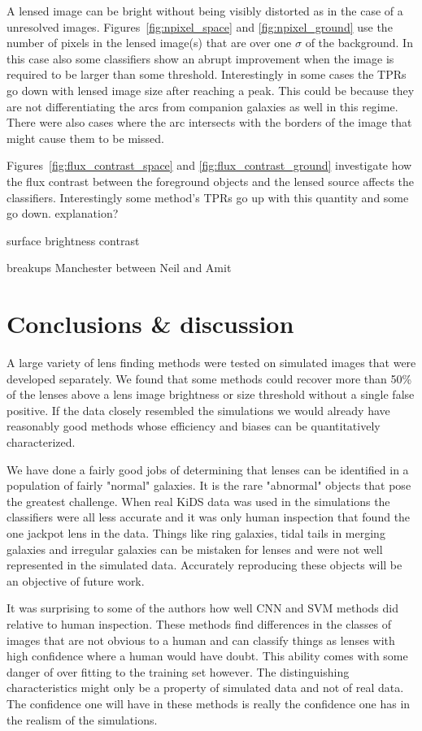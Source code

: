 \documentclass[useAMS,usenatbib]{mnras}
\newcommand{\red}[1]{{\color{red} #1}}
\begin{document}
A lensed image can be bright without being visibly distorted as in the case of a unresolved images.  Figures~\ref{fig:npixel_space} and \ref{fig:npixel_ground} use the number of pixels in the lensed image(s) that are over  one $\sigma$ of the background.  In this case also some classifiers show an abrupt improvement when the image is required to be larger than some threshold.  Interestingly in some cases the TPRs go down with lensed image size after reaching a peak.  This could be because they are not differentiating the arcs from companion galaxies as well in this regime.  There were also cases where the arc intersects with the borders of the image that might cause them to be missed.

Figures~\ref{fig:flux_contrast_space} and \ref{fig:flux_contrast_ground} investigate how the flux contrast between the foreground objects and the lensed source affects the classifiers.  Interestingly some method's TPRs go up with this quantity and some go down.  \red{explanation?}

\red{surface brightness contrast}

\red{breakups Manchester between Neil and Amit}

\section{Conclusions \& discussion}
\label{sec:conclusion}

A large variety of lens finding methods were tested on simulated images that were developed separately.    We found that some methods could recover more than 50\% of the lenses above a lens image brightness or size threshold without a single false positive.  If the data closely resembled the simulations we would already have reasonably good methods whose efficiency and biases can be quantitatively characterized.

We have done a fairly good jobs of determining that lenses can be identified in a population of fairly "normal" galaxies.  It is the rare "abnormal" objects that pose the greatest challenge.  When real KiDS data was used in the simulations the classifiers were all less accurate and it was only human inspection that found the one jackpot lens in the data.  Things like ring galaxies, tidal tails in merging galaxies and irregular galaxies can be mistaken for lenses and were not well represented in the simulated data.  Accurately reproducing these objects will be an objective of future work.

It was surprising to some of the authors how well CNN and SVM methods did relative to human inspection.  These methods find differences in the classes of images that are not obvious to a human and can classify things as lenses with high confidence where a human would have doubt.  This ability comes with some danger of over fitting to the training set however.  The distinguishing characteristics might only be a property of simulated data and not of real data.  The confidence one will have in these methods is really the confidence one has in the realism of the simulations.
\end{document}
